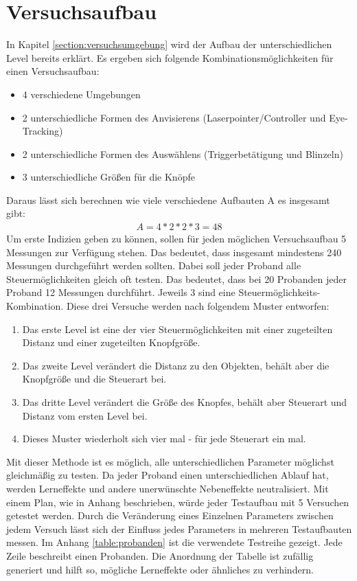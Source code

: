 \section{Versuchsaufbau} 
In Kapitel \ref{section:versuchsumgebung} wird der Aufbau der unterschiedlichen Level bereits erklärt. Es ergeben sich folgende Kombinationsmöglichkeiten für einen Versuchsaufbau:
\begin{itemize}
	\item 4 verschiedene Umgebungen
	\item 2 unterschiedliche Formen des Anvisierens (Laserpointer/Controller und Eye-Tracking)
	\item 2 unterschiedliche Formen des Auswählens (Triggerbetätigung und Blinzeln)
	\item 3 unterschiedliche Größen für die Knöpfe
\end{itemize}
Daraus lässt sich berechnen wie viele verschiedene Aufbauten A es insgesamt gibt:
\begin{align}
	A=4*2*2*3=48
\end{align}
Um erste Indizien geben zu können, sollen für jeden möglichen Versuchsaufbau 5 Messungen zur Verfügung stehen. Das bedeutet, dass insgesamt mindestens 240 Messungen durchgeführt werden sollten. Dabei soll jeder Proband alle Steuermöglichkeiten gleich oft testen. Das bedeutet, dass bei 20 Probanden jeder Proband 12 Messungen durchführt. Jeweils 3 sind eine Steuermöglichkeits-Kombination. Diese drei Versuche werden nach folgendem Muster entworfen:
\begin{enumerate}
	\item Das erste Level ist eine der vier Steuermöglichkeiten mit einer zugeteilten Distanz und einer zugeteilten Knopfgröße.
	\item Das zweite Level verändert die Distanz zu den Objekten, behält aber die Knopfgröße und die Steuerart bei.
	\item Das dritte Level verändert die Größe des Knopfes, behält aber Steuerart und Distanz vom ersten Level bei.
	\item Dieses Muster wiederholt sich vier mal - für jede Steuerart ein mal.
\end{enumerate}
Mit dieser Methode ist es möglich, alle unterschiedlichen Parameter möglichst gleichmäßig zu testen. Da jeder Proband einen unterschiedlichen Ablauf hat, werden Lerneffekte und andere unerwünschte Nebeneffekte neutralisiert. Mit einem Plan, wie in Anhang  beschrieben, würde jeder Testaufbau mit 5 Versuchen getestet werden. Durch die Veränderung eines Einzelnen Parameters zwischen jedem Versuch lässt sich der Einfluss jedes Parameters in mehreren Testaufbauten messen. Im Anhang \ref{table:probanden} ist die verwendete Testreihe gezeigt. Jede Zeile beschreibt einen Probanden. Die Anordnung der Tabelle ist zufällig generiert und hilft so, mögliche Lerneffekte oder ähnliches zu verhindern.

